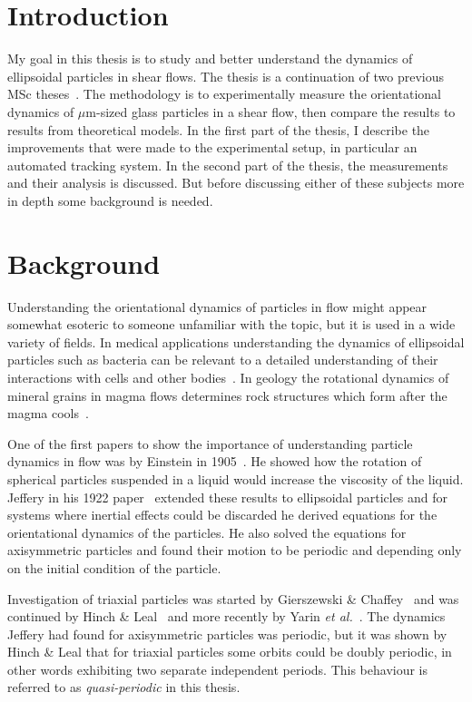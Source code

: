 \section{Introduction}
My goal in this thesis is to study and better understand the dynamics of ellipsoidal particles in shear flows. The thesis is a continuation of two previous MSc theses~\cite{AntonThesis, JonasThesis}. The methodology is to experimentally measure the orientational dynamics of $\mu$m-sized glass particles in a shear flow, then compare the results to results from theoretical models. In the first part of the thesis, I describe the improvements that were made to the experimental setup, in particular an automated tracking system. In the second part of the thesis, the measurements and their analysis is discussed. But before discussing either of these subjects more in depth some background is needed.

\section{Background}
Understanding the orientational dynamics of particles in flow might appear somewhat esoteric to someone unfamiliar with the topic, but it is used in a wide variety of fields. In medical applications understanding the dynamics of ellipsoidal particles such as bacteria can be relevant to a detailed understanding of their interactions with cells and other bodies~\cite{Tolga}. In geology the rotational dynamics of mineral grains in magma flows determines rock structures which form after the magma cools~\cite{geology}.

One of the first papers to show the importance of understanding particle dynamics in flow was by Einstein in 1905~\cite{Einstein}. He showed how the rotation of spherical particles suspended in a liquid would increase the viscosity of the liquid. Jeffery in his 1922 paper~\cite{Jeffery} extended these results to ellipsoidal  particles and for systems where inertial effects could be discarded he derived equations for the orientational dynamics of the particles. He also solved the equations for axisymmetric particles and found their motion to be periodic and depending only on the initial condition of the particle. 

Investigation of triaxial particles was started by Gierszewski \& Chaffey~\cite{Chaffey} and was continued by Hinch \& Leal~\cite{Leal} and more recently by Yarin \emph{et al.}~\cite{Yarin}. 
The dynamics Jeffery had found for axisymmetric particles was periodic, but it was shown by Hinch \& Leal that for triaxial particles some orbits could be doubly periodic, in other words exhibiting two separate independent periods. This behaviour is referred to as \emph{quasi-periodic} in this thesis.

